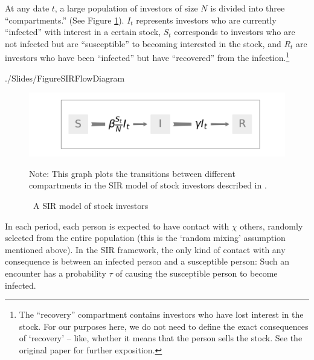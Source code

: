 At any date  $t$, a large population of investors of size $N$ is divided into three ``compartments.''  (See Figure \ref{fig:sir_diagram}).  $I_t$ represents investors who are currently ``infected'' with interest in a certain stock,  $S_t$ corresponds to investors who are not infected but are ``susceptible'' to becoming interested in the stock, and $R_t$ are investors who have been ``infected'' but have ``recovered'' from the infection.\footnote{The ``recovery'' compartment contains investors who have lost interest in the stock.  For our purposes here, we do not need to define the exact consequences of `recovery' -- like, whether it means that the person sells the stock.  See the original paper for further exposition.}
\begin{verbatimwrite}{./Slides/FigureSIRFlowDiagram}%
	\begin{figure}[!ht] \centering  %
		\caption{ ~A SIR model of stock investors}
		\label{fig:sir_diagram}
		\centerline{\includegraphics[width=1.5\textwidth]{./figures/flow_diagram}}
		\begin{flushleft}
			{\footnotesize Note: This graph plots the transitions between different compartments in the SIR model of stock investors described in \cite{shiller1989survey}. }
		\end{flushleft}
	\end{figure}
\end{verbatimwrite}%
\newcommand{\contactNum}{\chi}\newcommand{\tranProb}{\tau}\newcommand{\exposures}{\mathcal{E}}

In each period, each person is expected to have contact with $\contactNum$ others, randomly selected from the entire population (this is the `random mixing' assumption mentioned above).  In the SIR framework, the only kind of contact with any consequence is between an infected person and a susceptible person: Such an encounter has a probability $\tranProb$ of causing the susceptible person to become infected.

